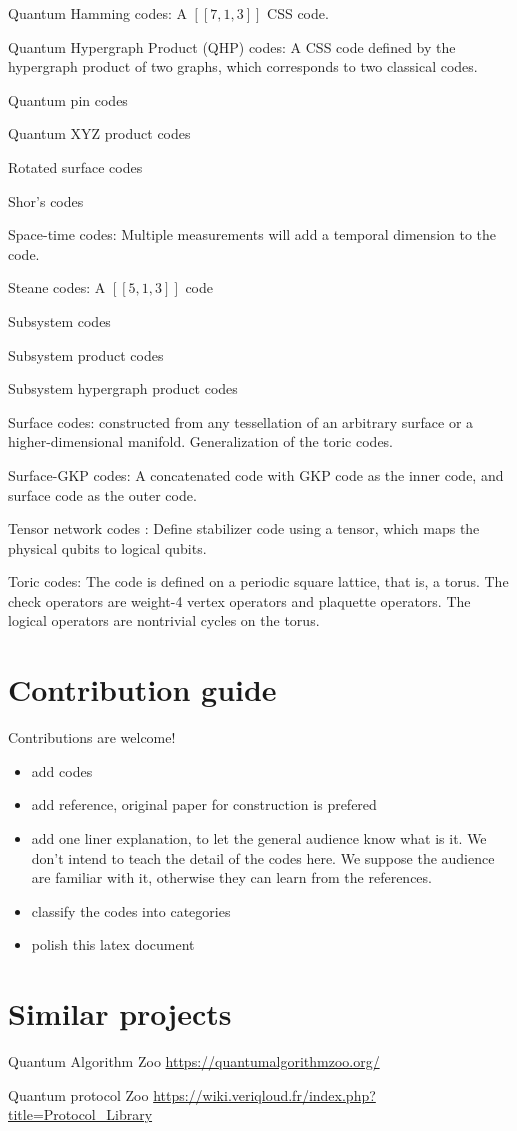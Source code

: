 \documentclass[aps,%
pra, twocolumn,%
notitlepage,longbibliography]{revtex4-2}
\begin{document}
Quantum Hamming codes:
A $[[7,1,3]]$ CSS code.


Quantum Hypergraph Product (QHP) codes:
A CSS code defined by the hypergraph product of two graphs, which
corresponds to two classical codes.

Quantum pin codes

Quantum XYZ product codes

Rotated surface codes

Shor's codes

Space-time codes: Multiple measurements will add a temporal dimension
to the code.

Steane codes: A $[[5,1,3]]$ code

Subsystem codes

Subsystem product codes

Subsystem hypergraph product codes

Surface codes: constructed from any tessellation of an arbitrary
surface or a higher-dimensional manifold. Generalization of the toric codes.

Surface-GKP codes: A concatenated code with GKP code as the inner
code, and surface code as the outer code.

Tensor network codes \cite{farrelly2020tensor}: Define stabilizer code
using a tensor, which maps the physical qubits to logical qubits.



Toric codes: The code is defined on a periodic square lattice, that
is, a torus. The check operators are weight-4 vertex operators and
plaquette operators. The logical operators are nontrivial cycles on
the torus.





\section{Contribution guide}
Contributions are welcome!
\begin{itemize}
\item add codes
\item add reference, original paper for construction is prefered
\item add one liner explanation, to let the general audience know what
  is it. We don't intend to teach the detail of the codes here. We
  suppose the audience are familiar with it, otherwise they can learn
  from the references.
\item classify the codes into categories
\item polish this latex document
\end{itemize}

\section{Similar projects}
Quantum Algorithm Zoo 
\url{https://quantumalgorithmzoo.org/}

Quantum protocol Zoo
\url{https://wiki.veriqloud.fr/index.php?title=Protocol_Library}


%
\end{document}
